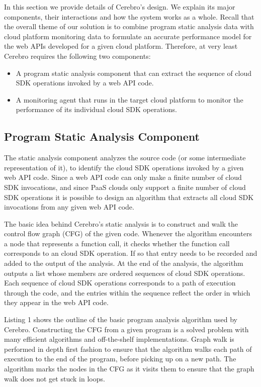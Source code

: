 In this section we provide details of Cerebro's design. We explain its major components, their interactions and how the 
system works as a whole. Recall that the overall theme of our solution is to combine program
static analysis data with cloud platform monitoring data to formulate an accurate performance model for the 
web APIs developed for a given cloud platform. Therefore, at very least Cerebro requires the following two components:

\begin{itemize}
\item A program static analysis component that can extract the sequence of cloud SDK operations invoked by a web API
code.
\item A monitoring agent that runs in the target cloud platform to monitor the performance of its individual cloud SDK
operations.
\end{itemize}
 
 \subsection{Program Static Analysis Component}
 The static analysis component analyzes the source code (or some intermediate representation of it), to identify
 the cloud SDK operations invoked by a given web API code. Since a web API code can only make a finite
 number of cloud SDK invocations, and since PaaS clouds only support a finite number of cloud
 SDK operations it is possible to design an algorithm that
 extracts all cloud SDK invocations from any given web API code. 
 
The basic idea behind Cerebro's static analysis is to construct and walk the
 control flow graph (CFG) of the given code. Whenever the algorithm encounters a node that represents a function call,
 it checks whether the function call corresponds to an cloud SDK operation. If so that entry needs to be recorded
 and added to the output of the analysis. At the end of the analysis, the algorithm outputs a list whose members are ordered
sequences of cloud SDK operations. Each sequence of cloud SDK operations corresponds to a
path of execution through the code, and the entries within the sequence reflect the order in which they appear
in the web API code.

Listing 1 shows the outline of the basic program analysis algorithm used by Cerebro. 
Constructing the CFG from a given program
is a solved problem with many efficient algorithms and off-the-shelf implementations. Graph walk is performed in depth first 
fashion to ensure that the algorithm walks each path of execution to the end of the program, before picking up on
a new path. The algorithm marks the nodes in the CFG as it visits them to ensure that the graph walk does not get stuck in loops. 

